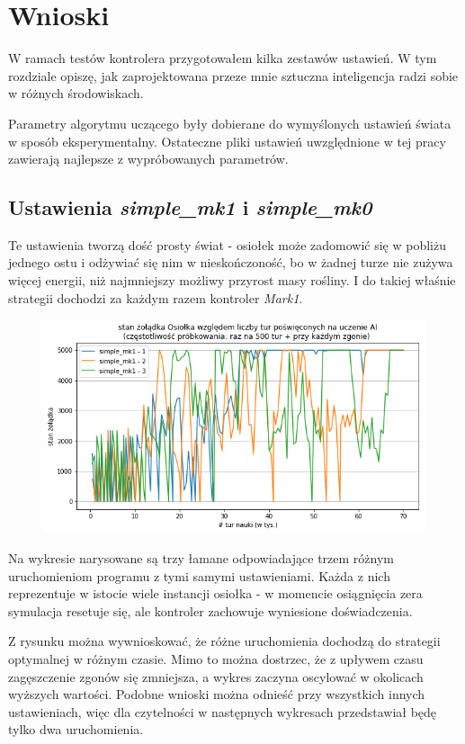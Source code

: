 \chapter{Wnioski}
W ramach testów kontrolera przygotowałem kilka zestawów ustawień. W tym rozdziale opiszę, jak zaprojektowana przeze mnie sztuczna inteligencja radzi sobie w różnych środowiskach.

Parametry algorytmu uczącego były dobierane do wymyślonych ustawień świata w sposób eksperymentalny. Ostateczne pliki ustawień uwzględnione w tej pracy zawierają najlepsze z wypróbowanych parametrów.

\section{Ustawienia \textit{simple\_mk1} i \textit{simple\_mk0}}
Te ustawienia tworzą dość prosty świat - osiołek może zadomowić się w pobliżu jednego ostu i odżywiać się nim w nieskończoność, bo w żadnej turze nie zużywa więcej energii, niż najmniejszy możliwy przyrost masy rośliny. I do takiej właśnie strategii dochodzi za każdym razem kontroler \textit{Mark1}.
\begin{figure}[H]
    \centering
    \includegraphics[scale=0.6]{Chapters/simple_mk1_hunger}
\end{figure}

Na wykresie narysowane są trzy łamane odpowiadające trzem różnym uruchomieniom programu z tymi samymi ustawieniami. Każda z nich reprezentuje w istocie wiele instancji osiołka - w momencie osiągnięcia zera symulacja resetuje się, ale kontroler zachowuje wyniesione doświadczenia. 

Z rysunku można wywnioskować, że różne uruchomienia dochodzą do strategii optymalnej w różnym czasie. Mimo to można dostrzec, że z upływem czasu zagęszczenie zgonów się zmniejsza, a wykres zaczyna oscylować w okolicach wyższych wartości. Podobne wnioski można odnieść przy wszystkich innych ustawieniach, więc dla czytelności w następnych wykresach przedstawiał będę tylko dwa uruchomienia.

